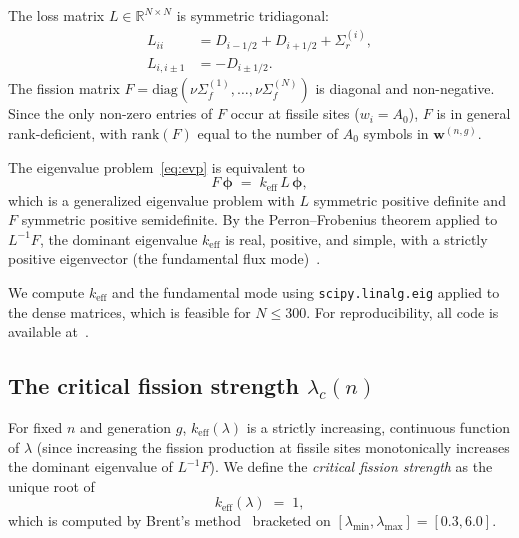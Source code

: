\documentclass[11pt]{article}
\newcommand{\keff}{k_{\mathrm{eff}}}
\newcommand{\lc}{\lambda_c}
\newcommand{\Sigmar}{\Sigma_r}
\newcommand{\nuSigmaf}{\nu\Sigma_f}
\newcommand{\R}{\mathbb{R}}
\begin{document}
The loss matrix $L \in \R^{N \times N}$ is symmetric tridiagonal:
\begin{align}
  L_{ii}   &= D_{i-1/2} + D_{i+1/2} + \Sigmar^{(i)}, \label{eq:L-diag}\\
  L_{i,i\pm 1} &= -D_{i\pm 1/2}.                      \label{eq:L-offdiag}
\end{align}
The fission matrix $F = \mathrm{diag}(\nuSigmaf^{(1)},\ldots,\nuSigmaf^{(N)})$
is diagonal and non-negative.
Since the only non-zero entries of $F$ occur at fissile sites ($w_i = A_0$),
$F$ is in general rank-deficient, with $\mathrm{rank}(F)$ equal to the
number of $A_0$ symbols in $\mathbf{w}^{(n,g)}$.

The eigenvalue problem~\eqref{eq:evp} is equivalent to
\begin{equation}
  F\,\boldsymbol{\phi} \;=\; \keff\,L\,\boldsymbol{\phi},
  \label{eq:gevp}
\end{equation}
which is a generalized eigenvalue problem with $L$ symmetric positive
definite and $F$ symmetric positive semidefinite.
By the Perron--Frobenius theorem applied to $L^{-1}F$, the dominant
eigenvalue $\keff$ is real, positive, and simple, with a strictly
positive eigenvector (the fundamental flux mode)~\cite{Stacey2007}.

We compute $\keff$ and the fundamental mode using \texttt{scipy.linalg.eig}
applied to the dense matrices, which is feasible for $N \leq 300$.
For reproducibility, all code is available at~\cite{GrossiRepo2026}.

\subsection{The critical fission strength $\lc(n)$}
\label{sec:lambdac}

For fixed $n$ and generation $g$, $\keff(\lambda)$ is a strictly increasing,
continuous function of $\lambda$ (since increasing the fission production at
fissile sites monotonically increases the dominant eigenvalue of $L^{-1}F$).
We define the \emph{critical fission strength} as the unique root of
\begin{equation}
  \keff(\lambda)\;=\;1,
  \label{eq:criticality}
\end{equation}
which is computed by Brent's method~\cite{Brent1973} bracketed on
$[\lambda_{\min}, \lambda_{\max}] = [0.3, 6.0]$.
\end{document}
